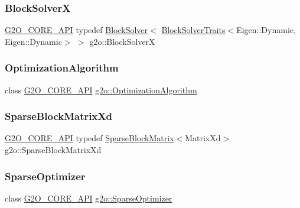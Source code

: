 \subsubsection{\texorpdfstring{Block\+SolverX}{BlockSolverX}}
{\footnotesize\ttfamily \mbox{\hyperlink{g2o__core__api_8h_a7a8d7648d6f1e26632566f335751d064}{G2\+O\+\_\+\+C\+O\+R\+E\+\_\+\+A\+PI}} typedef \mbox{\hyperlink{classg2o_1_1_block_solver}{Block\+Solver}}$<$ \mbox{\hyperlink{structg2o_1_1_block_solver_traits}{Block\+Solver\+Traits}}$<$Eigen\+::\+Dynamic, Eigen\+::\+Dynamic$>$ $>$ g2o\+::\+Block\+SolverX}

\mbox{\label{namespaceg2o_a3beb17b066b63dedd1d49fe5c8db1b3e}} 
\subsubsection{\texorpdfstring{Optimization\+Algorithm}{OptimizationAlgorithm}}
{\footnotesize\ttfamily class \mbox{\hyperlink{g2o__core__api_8h_a7a8d7648d6f1e26632566f335751d064}{G2\+O\+\_\+\+C\+O\+R\+E\+\_\+\+A\+PI}} \mbox{\hyperlink{classg2o_1_1_optimization_algorithm}{g2o\+::\+Optimization\+Algorithm}}}

\mbox{\label{namespaceg2o_a711432ca707cf7aee387c3cca80d84e7}} 
\subsubsection{\texorpdfstring{Sparse\+Block\+Matrix\+Xd}{SparseBlockMatrixXd}}
{\footnotesize\ttfamily \mbox{\hyperlink{g2o__core__api_8h_a7a8d7648d6f1e26632566f335751d064}{G2\+O\+\_\+\+C\+O\+R\+E\+\_\+\+A\+PI}} typedef \mbox{\hyperlink{classg2o_1_1_sparse_block_matrix}{Sparse\+Block\+Matrix}}$<$Matrix\+Xd$>$ g2o\+::\+Sparse\+Block\+Matrix\+Xd}

\mbox{\label{namespaceg2o_a9b3a9d8e71f5779358eaa12ed7cb8b4c}} 
\subsubsection{\texorpdfstring{Sparse\+Optimizer}{SparseOptimizer}}
{\footnotesize\ttfamily class \mbox{\hyperlink{g2o__core__api_8h_a7a8d7648d6f1e26632566f335751d064}{G2\+O\+\_\+\+C\+O\+R\+E\+\_\+\+A\+PI}} \mbox{\hyperlink{classg2o_1_1_sparse_optimizer}{g2o\+::\+Sparse\+Optimizer}}}

